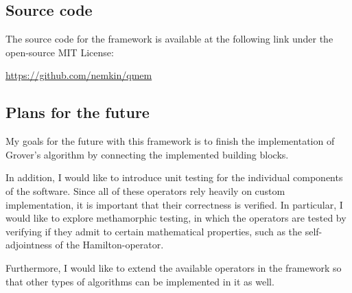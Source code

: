\subsection{Source code}

The source code for the framework is available at the following link under the open-source MIT License:

\href{https://github.com/nemkin/qmem}{https://github.com/nemkin/qmem}

\subsection{Plans for the future}

My goals for the future with this framework is to finish the implementation of Grover's algorithm by connecting the implemented building blocks.

In addition, I would like to introduce unit testing for the individual components of the software. Since all of these operators rely heavily on custom implementation, it is important that their correctness is verified. In particular, I would like to explore methamorphic testing, in which the operators are tested by verifying if they admit to certain mathematical properties, such as the self-adjointness of the Hamilton-operator.

Furthermore, I would like to extend the available operators in the framework so that other types of algorithms can be implemented in it as well.
